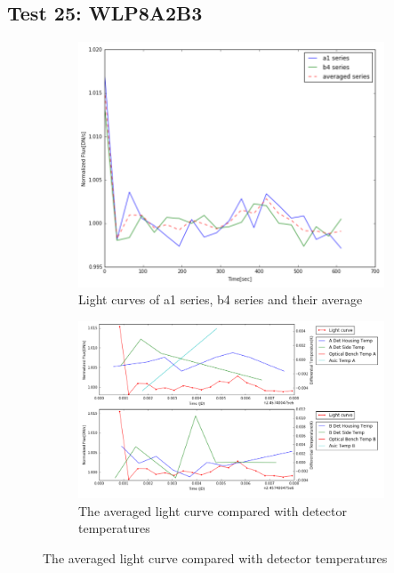 \documentclass[conference]{IEEEtran}
\begin{document}
\subsection{Test 25: WLP8A2B3} 
\begin{figure}[H]
    \centering
    \begin{subfigure}{1}
        \includegraphics[scale=0.4]{ts_test25}
        \caption{Light curves of a1 series, b4 series and their average}
    \end{subfigure}

    \begin{subfigure}{2}
        \includegraphics[scale=0.4]{temp_test25}
        \caption{The averaged light curve compared with detector temperatures}
    \end{subfigure}
   

\end{figure}
\end{document}
